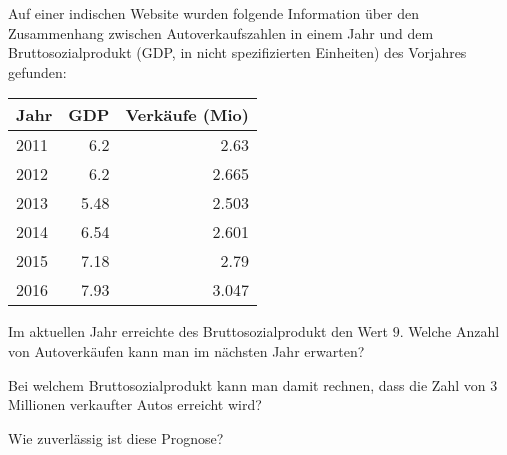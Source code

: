 Auf einer indischen Website wurden folgende Information über den
Zusammenhang zwischen Autoverkaufszahlen in einem Jahr und
dem Bruttosozialprodukt (GDP, in nicht spezifizierten Einheiten)
des Vorjahres gefunden:
\begin{center}
\begin{tabular}{|l|r|r|}
\hline
Jahr&GDP&Verkäufe (Mio)\\
\hline
2011&6.2\phantom{0}&2.63\phantom{0}\\
2012&6.2\phantom{0}&2.665\\
2013&5.48&2.503\\
2014&6.54&2.601\\
2015&7.18&2.79\phantom{0}\\
2016&7.93&3.047\\
\hline
\end{tabular}
\end{center}
\begin{teilaufgaben}
\item 
Im aktuellen Jahr erreichte des Bruttosozialprodukt den Wert $9$.
Welche Anzahl von Autoverkäufen kann man im nächsten Jahr erwarten?
\item
Bei welchem Bruttosozialprodukt kann man damit rechnen, dass die
Zahl von 3 Millionen verkaufter Autos erreicht wird?
\item
Wie zuverlässig ist diese Prognose?
\end{teilaufgaben}


